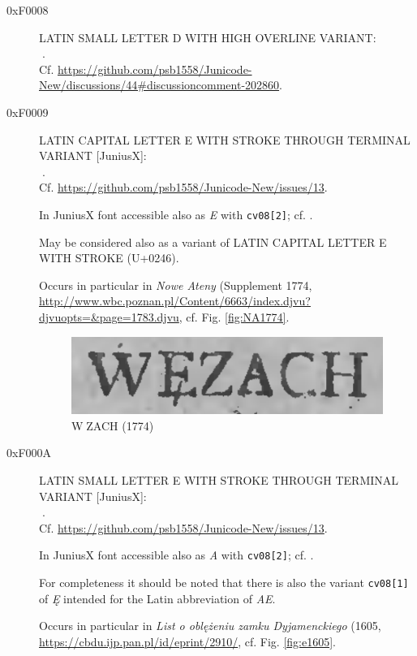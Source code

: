 \documentclass{article}
\newcommand{\Jglyph}[1]{{\relsize{2}\J#1}}
\begin{document}
\begin{description}
  
\item [0xF0008] LATIN SMALL LETTER D WITH HIGH OVERLINE VARIANT:\\
  \Jglyph{󰀈}.\\ Cf. \url{https://github.com/psb1558/Junicode-New/discussions/44#discussioncomment-202860}.
\item [0xF0009] LATIN CAPITAL LETTER E WITH STROKE THROUGH TERMINAL VARIANT [JuniusX]:\\
  \Jglyph{󰀉}.\\ Cf. \url{https://github.com/psb1558/Junicode-New/issues/13}.
  
  In JuniusX font accessible also as \textit{E} with \texttt{cv08[2]};
  cf. \autocite[p. 7]{baker20:_opent_featur_junius_junius}.

 May be considered also as a variant of LATIN CAPITAL LETTER E WITH
 STROKE (U+0246).

 Occurs in particular in \textit{Nowe Ateny} (Supplement 1774,
 \url{http://www.wbc.poznan.pl/Content/6663/index.djvu?djvuopts=&page=1783.djvu},
 cf. Fig. \vref{fig:NA1774}.
 

  \begin{figure}[h]
    \includegraphics[width=1.3\textwidth]{img/00435077wezach}
    \caption{\J W󰀉ZACH (1774)}
    \label{fig:NA1774}
  \end{figure}

 \item [0xF000A] LATIN SMALL LETTER E WITH STROKE THROUGH TERMINAL VARIANT [JuniusX]:\\
  \Jglyph{󰀊}.\\ Cf. \url{https://github.com/psb1558/Junicode-New/issues/13}.

  In JuniusX font accessible also as \textit{A} with \texttt{cv08[2]};
  cf. \autocite[p. 7]{baker20:_opent_featur_junius_junius}.

  For completeness it should be noted that there is also the variant
  \texttt{cv08[1]} of \textit{Ę} intended for the Latin abbreviation
  of \textit{AE}.

 Occurs in particular in \textit{List o oblężeniu zamku Dyjamenckiego} (1605,
 \url{https://cbdu.ijp.pan.pl/id/eprint/2910/},
 cf. Fig. \vref{fig:e1605}.
 

\end{description}
\end{document}

